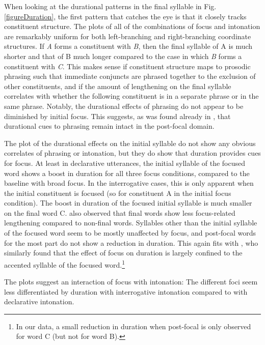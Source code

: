 \documentclass[preprint,review,12pt,authoryear,times]{elsarticle}
\begin{document}
When looking at the durational patterns in the final syllable in Fig. \ref{figureDuration}, the first pattern that catches the eye is that it closely tracks constituent structure. The plots of all of the combinations of focus and intonation are remarkably uniform for both left-branching and right-branching coordinate structures. If {\em A} forms a constituent with {\em B}, then the final syllable of A is much shorter and that of B much longer compared to the case in which {\em B} forms a constituent with {\em C}.  This makes sense if constituent structure maps to prosodic phrasing such that immediate conjuncts are phrased together to the exclusion of other constituents, and if the amount of lengthening on the final syllable correlates with whether the following constituent is in a separate phrase or in the same phrase. Notably, the durational effects of phrasing do not appear to be diminished by initial focus. This suggests, as was found already in \citet{norcl05}, that durational cues to phrasing remain intact in the post-focal domain. 

The plot of the durational effects on the initial syllable do not show any obvious correlates of phrasing or intonation, but they do show that duration provides cues for focus. At least in declarative utterances, the initial syllable of the focused word shows a boost in duration for all three focus conditions, compared to the baseline with broad focus. In the interrogative cases, this is only apparent when the initial constituent is focused (so for constituent A in the initial focus condition). The boost in duration of the focused initial syllable is much smaller on the final word C. \citet{coope85} also observed that final words show less focus-related lengthening compared to non-final words. Syllables other than the initial syllable of the focused word seem to be mostly unaffected by focus, and post-focal words for the most part do not show a reduction in duration. This again fits with \citet{coope85}, who similarly found that the effect of focus on duration is largely confined to the accented syllable of the focused word.\footnote{In our data, a small reduction in duration when post-focal is only observed for word C (but not for word B).} 

The plots suggest an interaction of focus with intonation: The different foci seem less differentiated by duration with interrogative intonation compared to with declarative intonation. 
\end{document}

